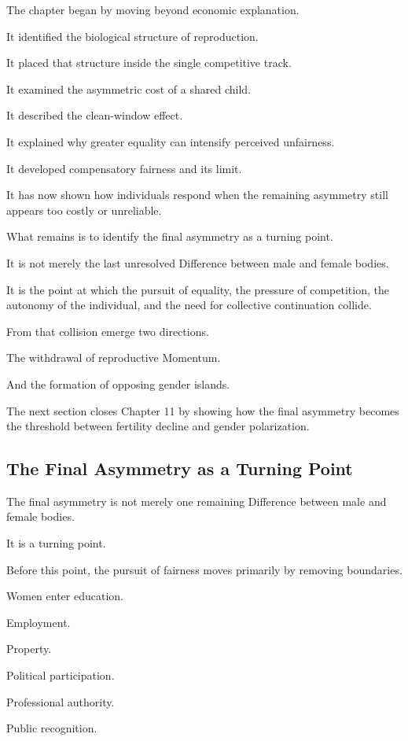 The chapter began by moving beyond economic explanation.

It identified the biological structure of reproduction.

It placed that structure inside the single competitive track.

It examined the asymmetric cost of a shared child.

It described the clean-window effect.

It explained why greater equality can intensify perceived unfairness.

It developed compensatory fairness and its limit.

It has now shown how individuals respond when the remaining asymmetry still appears too costly or unreliable.

What remains is to identify the final asymmetry as a turning point.

It is not merely the last unresolved Difference between male and female bodies.

It is the point at which the pursuit of equality, the pressure of competition, the autonomy of the individual, and the need for collective continuation collide.

From that collision emerge two directions.

The withdrawal of reproductive Momentum.

And the formation of opposing gender islands.

The next section closes Chapter 11 by showing how the final asymmetry becomes the threshold between fertility decline and gender polarization.

\subsection*{\textbf{The Final Asymmetry as a Turning Point}} 


The final asymmetry is not merely one remaining Difference between male and female bodies.

It is a turning point.

Before this point, the pursuit of fairness moves primarily by removing boundaries.

Women enter education.

Employment.

Property.

Political participation.

Professional authority.

Public recognition.

